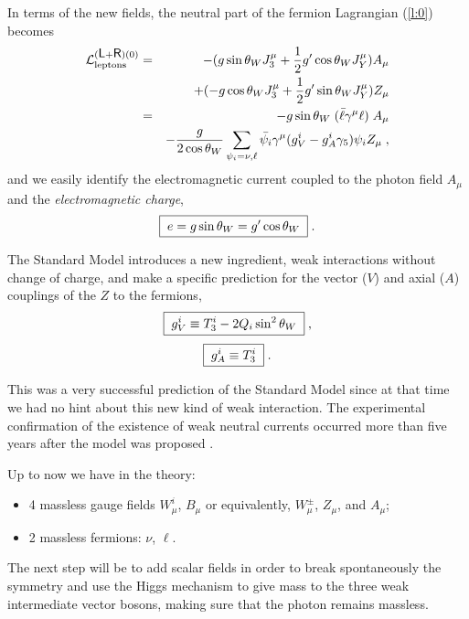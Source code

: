 \documentclass[12pt]{report}
\def\text#1{{\scriptstyle\mathrm{#1}}}
\newcommand{\gc}{\gamma_5}
\newcommand{\g}{\gamma}
\newcommand{\ld}{\mbox{\sf L}}
\newcommand{\rs}{\mbox{\sf R}}
\newcommand{\lag}{{\cal L}}
\begin{document}
In terms of the new fields, the neutral part of the fermion
Lagrangian (\ref{l:0}) becomes 
\begin{eqnarray}
\lag_{\text{leptons}}^{(\ld + \rs) (0)} &=& - ( { g \sin\theta_W}
J_3^\mu + 
\frac{1}{2} { g' \cos \theta_W}  J_Y^\mu) A_\mu
\nonumber \\
&& + (- g \cos\theta_W J_3^\mu + \frac{1}{2} g' \sin \theta_W  J_Y^\mu) Z_\mu
\nonumber \\
&=& - { g \sin\theta_W} \; { (\bar{\ell} \g^\mu \ell)}
\; A_\mu \nonumber \\
&& - \frac{g}{2 \cos\theta_W} \sum_{\psi_i = \nu, \ell} 
\bar{\psi_i} \g^\mu (g_V^i - g_A^i \gc) \psi_i Z_\mu \; ,
\label{neu:cur} 
\end{eqnarray}
and we easily identify the electromagnetic current coupled to the
photon field $A_\mu$ and the {\it electromagnetic charge},
\begin{equation}
\fbox{$ \; \displaystyle{e = g \sin\theta_W = g' \cos\theta_W} \; $}
\; .
\label{e}
\end{equation}

The Standard Model introduces a new ingredient, weak interactions
without change of charge, and make a specific prediction for the
vector ($V$) and axial ($A$) couplings of the $Z$ to the fermions,
\begin{equation}
\fbox{$ \; \displaystyle{g_V^i \equiv T_3^i - 2 Q_i \sin^2\theta_W} \;
$} \; ,
\label{gv}
\end{equation}
\begin{equation}
\fbox{$ \; \displaystyle{g_A^i \equiv T_3^i} \; $} \; .
\label{ga}
\end{equation}

This was a very successful prediction of the Standard Model since at
that time we had no hint about this new kind of weak interaction. 
The experimental confirmation of the existence of weak neutral
currents occurred more than five years after the model was proposed
\cite{Hasert:73a}.

Up to now we have in the theory:   
\begin{itemize}
\item 4 massless gauge fields $W^i_\mu$, $B_\mu$ or equivalently,
$W^\pm_\mu$, $Z_\mu$, and $A_\mu$;

\item 2 massless fermions: $\nu$, $\ell$.
\end{itemize}

The next step will be to add scalar fields in order to break
spontaneously the symmetry and use the Higgs mechanism to give mass
to the three weak intermediate vector bosons, making sure that the
photon remains massless.
\end{document}
